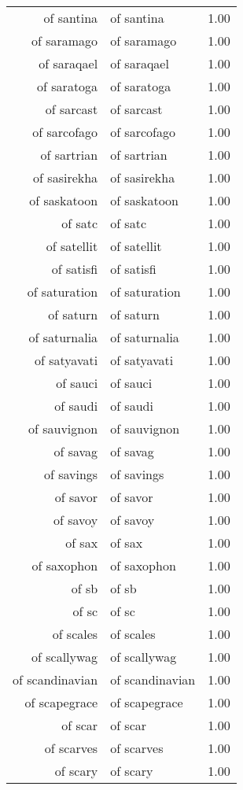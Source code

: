 \begin{table}[ht]
\begin{tabular}{rlr}
  of santina & of santina & 1.00 \\ 
  of saramago & of saramago & 1.00 \\ 
  of saraqael & of saraqael & 1.00 \\ 
  of saratoga & of saratoga & 1.00 \\ 
  of sarcast & of sarcast & 1.00 \\ 
  of sarcofago & of sarcofago & 1.00 \\ 
  of sartrian & of sartrian & 1.00 \\ 
  of sasirekha & of sasirekha & 1.00 \\ 
  of saskatoon & of saskatoon & 1.00 \\ 
  of satc & of satc & 1.00 \\ 
  of satellit & of satellit & 1.00 \\ 
  of satisfi & of satisfi & 1.00 \\ 
  of saturation & of saturation & 1.00 \\ 
  of saturn & of saturn & 1.00 \\ 
  of saturnalia & of saturnalia & 1.00 \\ 
  of satyavati & of satyavati & 1.00 \\ 
  of sauci & of sauci & 1.00 \\ 
  of saudi & of saudi & 1.00 \\ 
  of sauvignon & of sauvignon & 1.00 \\ 
  of savag & of savag & 1.00 \\ 
  of savings & of savings & 1.00 \\ 
  of savor & of savor & 1.00 \\ 
  of savoy & of savoy & 1.00 \\ 
  of sax & of sax & 1.00 \\ 
  of saxophon & of saxophon & 1.00 \\ 
  of sb & of sb & 1.00 \\ 
  of sc & of sc & 1.00 \\ 
  of scales & of scales & 1.00 \\ 
  of scallywag & of scallywag & 1.00 \\ 
  of scandinavian & of scandinavian & 1.00 \\ 
  of scapegrace & of scapegrace & 1.00 \\ 
  of scar & of scar & 1.00 \\ 
  of scarves & of scarves & 1.00 \\ 
  of scary & of scary & 1.00 \\ 

\end{tabular}
\end{table}

